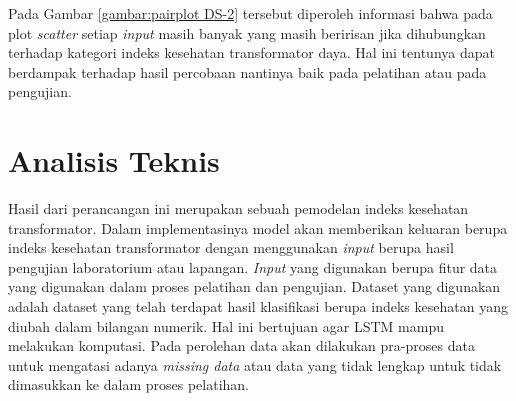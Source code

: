 Pada Gambar \ref{gambar:pairplot DS-2} tersebut diperoleh informasi bahwa pada plot \textit{scatter} setiap \textit{input} masih banyak yang masih beririsan jika dihubungkan terhadap kategori indeks kesehatan transformator daya. Hal ini tentunya dapat berdampak terhadap hasil percobaan nantinya baik pada pelatihan atau pada pengujian. 




\section{Analisis Teknis}

Hasil dari perancangan ini merupakan sebuah pemodelan indeks kesehatan transformator. Dalam implementasinya model akan memberikan keluaran berupa indeks kesehatan transformator dengan menggunakan \textit{input} berupa hasil pengujian laboratorium atau lapangan. \textit{Input} yang digunakan berupa fitur data yang digunakan dalam proses pelatihan dan pengujian. Dataset yang digunakan adalah dataset yang telah terdapat hasil klasifikasi berupa indeks kesehatan yang diubah dalam bilangan numerik. Hal ini bertujuan agar LSTM mampu melakukan komputasi. Pada perolehan data akan dilakukan pra-proses data untuk mengatasi adanya \textit{missing data} atau data yang tidak lengkap untuk tidak dimasukkan ke dalam proses pelatihan.


